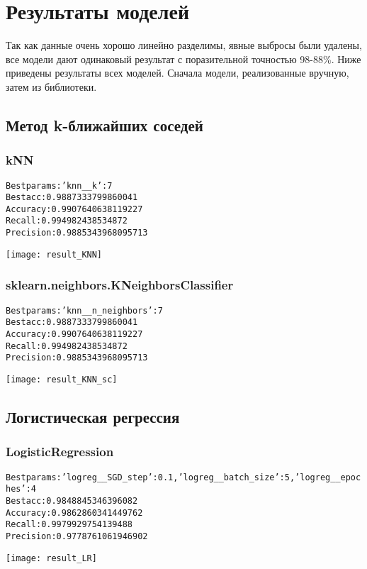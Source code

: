 \graphicspath{{images/}}
\section{Результаты моделей}
Так как данные очень хорошо линейно разделимы, явные выбросы были удалены, все модели дают одинаковый результат с поразительной точностью 98-88\%. 
Ниже приведены результаты всех моделей. Сначала модели, реализованные вручную, затем из библиотеки.

\subsection{Метод k-ближайших соседей}
\subsubsection{kNN}
\begin{alltt}
Best params: {'knn__k': 7}
Best acc: 0.9887333799860041
Accuracy: 0.9907640638119227
Recall: 0.994982438534872
Precision: 0.9885343968095713
\end{alltt}
\begin{center}
\texttt{[image: result\_KNN]}
\end{center}
\pagebreak

\subsubsection{sklearn.neighbors.KNeighborsClassifier}
\begin{alltt}
Best params: {'knn__n_neighbors': 7}
Best acc: 0.9887333799860041
Accuracy: 0.9907640638119227
Recall: 0.994982438534872
Precision: 0.9885343968095713
\end{alltt}
\begin{center}
\texttt{[image: result\_KNN\_sc]}
\end{center}
\pagebreak

\subsection{Логистическая регрессия}
\subsubsection{LogisticRegression}
\begin{alltt}
Best params: {'logreg__SGD_step': 0.1, 'logreg__batch_size': 5, 'logreg__epoches': 4}
Best acc: 0.9848845346396082
Accuracy: 0.9862860341449762
Recall: 0.9979929754139488
Precision: 0.9778761061946902
\end{alltt}
\begin{center}
\texttt{[image: result\_LR]}
\end{center}


